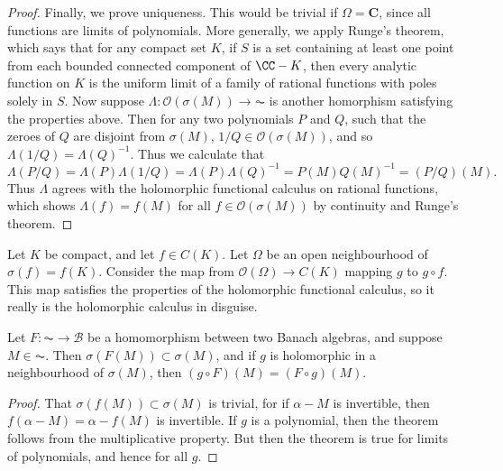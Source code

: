 \begin{proof}
    Finally, we prove uniqueness. This would be trivial if $\Omega = \mathbf{C}$, since all functions are limits of polynomials. More generally, we apply Runge's theorem, which says that for any compact set $K$, if $S$ is a set containing at least one point from each bounded connected component of $\CC - K$, then every analytic function on $K$ is the uniform limit of a family of rational functions with poles solely in $S$. Now suppose $\Lambda: \mathcal{O}(\sigma(M)) \to \AC$ is another homorphism satisfying the properties above. Then for any two polynomials $P$ and $Q$, such that the zeroes of $Q$ are disjoint from $\sigma(M)$, $1/Q \in \mathcal{O}(\sigma(M))$, and so $\Lambda(1/Q) = \Lambda(Q)^{-1}$. Thus we calculate that
    \[ \Lambda(P/Q) = \Lambda(P) \Lambda(1/Q) = \Lambda(P) \Lambda(Q)^{-1} = P(M) Q(M)^{-1} = (P/Q)(M). \]
    Thus $\Lambda$ agrees with the holomorphic functional calculus on rational functions, which shows $\Lambda(f) = f(M)$ for all $f \in \mathcal{O}(\sigma(M))$ by continuity and Runge's theorem.
\end{proof}

\begin{example}
    Let $K$ be compact, and let $f \in C(K)$. Let $\Omega$ be an open neighbourhood of $\sigma(f) = f(K)$. Consider the map from $\mathcal{O}(\Omega) \to C(K)$ mapping $g$ to $g \circ f$. This map satisfies the properties of the holomorphic functional calculus, so it really is the holomorphic calculus in disguise.
\end{example}

\begin{theorem}
    Let $F: \AC \to \mathcal{B}$ be a homomorphism between two Banach algebras, and suppose $M \in \AC$. Then $\sigma(F(M)) \subset \sigma(M)$, and if $g$ is holomorphic in a neighbourhood of $\sigma(M)$, then $(g \circ F)(M) = (F \circ g)(M)$.
\end{theorem}
\begin{proof}
    That $\sigma(f(M)) \subset \sigma(M)$ is trivial, for if $\alpha - M$ is invertible, then $f(\alpha - M) = \alpha - f(M)$ is invertible. If $g$ is a polynomial, then the theorem follows from the multiplicative property. But then the theorem is true for limits of polynomials, and hence for all $g$.
\end{proof}

